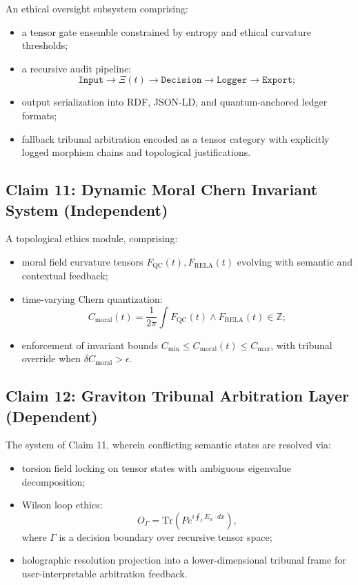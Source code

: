 \documentclass[12pt]{article}
\begin{document}
An ethical oversight subsystem comprising:

\begin{itemize}
    \item a tensor gate ensemble constrained by entropy and ethical curvature thresholds;
    \item a recursive audit pipeline:
    \[
    \texttt{Input} \rightarrow \Xi(t) \rightarrow \texttt{Decision} \rightarrow \texttt{Logger} \rightarrow \texttt{Export};
    \]
    \item output serialization into RDF, JSON-LD, and quantum-anchored ledger formats;
    \item fallback tribunal arbitration encoded as a tensor category with explicitly logged morphism chains and topological justifications.
\end{itemize}

\subsection*{Claim 11: Dynamic Moral Chern Invariant System (Independent)}

A topological ethics module, comprising:

\begin{itemize}
    \item moral field curvature tensors \( F_{\text{QC}}(t), F_{\text{RELA}}(t) \) evolving with semantic and contextual feedback;
    \item time-varying Chern quantization:
    \[
    C_{\text{moral}}(t) = \frac{1}{2\pi} \int F_{\text{QC}}(t) \wedge F_{\text{RELA}}(t) \in \mathbb{Z};
    \]
    \item enforcement of invariant bounds \( C_{\text{min}} \leq C_{\text{moral}}(t) \leq C_{\text{max}} \), with tribunal override when \( \delta C_{\text{moral}} > \epsilon \).
\end{itemize}

\subsection*{Claim 12: Graviton Tribunal Arbitration Layer (Dependent)}

The system of Claim 11, wherein conflicting semantic states are resolved via:

\begin{itemize}
    \item torsion field locking on tensor states with ambiguous eigenvalue decomposition;
    \item Wilson loop ethics:
    \[
    O_\Gamma = \text{Tr}\left(P e^{i\oint_\Gamma E_\alpha \cdot dx}\right),
    \]
    where \( \Gamma \) is a decision boundary over recursive tensor space;
    \item holographic resolution projection into a lower-dimensional tribunal frame for user-interpretable arbitration feedback.
\end{itemize}
\end{document}
